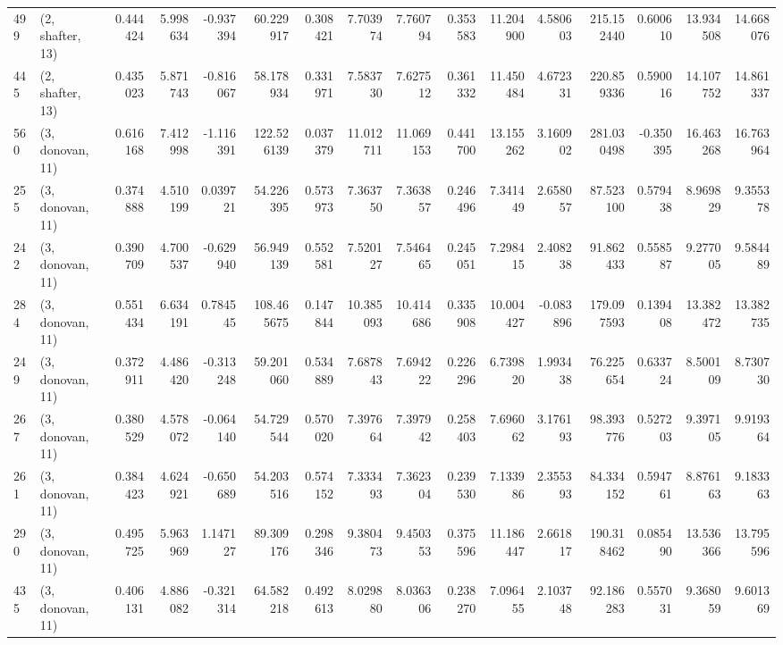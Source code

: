 \begin{tabular}{llrrrrrrrrrrrrrr}
499 &  (2, shafter, 13) &   0.444424 &   5.998634 &  -0.937394 &    60.229917 &   0.308421 &   7.703974 &   7.760794 &  0.353583 &  11.204900 &   4.580603 &   215.152440 &  0.600610 &  13.934508 &  14.668076 \\
445 &  (2, shafter, 13) &   0.435023 &   5.871743 &  -0.816067 &    58.178934 &   0.331971 &   7.583730 &   7.627512 &  0.361332 &  11.450484 &   4.672331 &   220.859336 &  0.590016 &  14.107752 &  14.861337 \\
560 &  (3, donovan, 11) &   0.616168 &   7.412998 &  -1.116391 &   122.526139 &   0.037379 &  11.012711 &  11.069153 &  0.441700 &  13.155262 &   3.160902 &   281.030498 & -0.350395 &  16.463268 &  16.763964 \\
255 &  (3, donovan, 11) &   0.374888 &   4.510199 &   0.039721 &    54.226395 &   0.573973 &   7.363750 &   7.363857 &  0.246496 &   7.341449 &   2.658057 &    87.523100 &  0.579438 &   8.969829 &   9.355378 \\
242 &  (3, donovan, 11) &   0.390709 &   4.700537 &  -0.629940 &    56.949139 &   0.552581 &   7.520127 &   7.546465 &  0.245051 &   7.298415 &   2.408238 &    91.862433 &  0.558587 &   9.277005 &   9.584489 \\
284 &  (3, donovan, 11) &   0.551434 &   6.634191 &   0.784545 &   108.465675 &   0.147844 &  10.385093 &  10.414686 &  0.335908 &  10.004427 &  -0.083896 &   179.097593 &  0.139408 &  13.382472 &  13.382735 \\
249 &  (3, donovan, 11) &   0.372911 &   4.486420 &  -0.313248 &    59.201060 &   0.534889 &   7.687843 &   7.694222 &  0.226296 &   6.739820 &   1.993438 &    76.225654 &  0.633724 &   8.500109 &   8.730730 \\
267 &  (3, donovan, 11) &   0.380529 &   4.578072 &  -0.064140 &    54.729544 &   0.570020 &   7.397664 &   7.397942 &  0.258403 &   7.696062 &   3.176193 &    98.393776 &  0.527203 &   9.397105 &   9.919364 \\
261 &  (3, donovan, 11) &   0.384423 &   4.624921 &  -0.650689 &    54.203516 &   0.574152 &   7.333493 &   7.362304 &  0.239530 &   7.133986 &   2.355393 &    84.334152 &  0.594761 &   8.876163 &   9.183363 \\
290 &  (3, donovan, 11) &   0.495725 &   5.963969 &   1.147127 &    89.309176 &   0.298346 &   9.380473 &   9.450353 &  0.375596 &  11.186447 &   2.661817 &   190.318462 &  0.085490 &  13.536366 &  13.795596 \\
435 &  (3, donovan, 11) &   0.406131 &   4.886082 &  -0.321314 &    64.582218 &   0.492613 &   8.029880 &   8.036306 &  0.238270 &   7.096455 &   2.103748 &    92.186283 &  0.557031 &   9.368059 &   9.601369 \\

\end{tabular}
